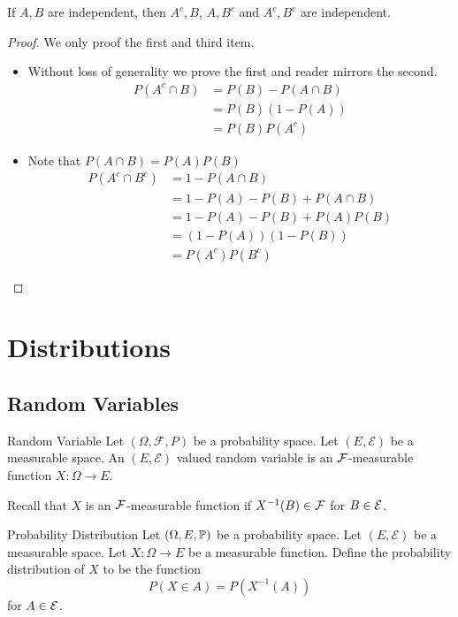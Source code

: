 \documentclass[a4paper]{article}
\begin{document}
\begin{prp}{}{} If $A,B$ are independent, then $A^c,B$, $A,B^c$ and $A^c,B^c$ are independent. 
\end{prp}
\begin{proof} We only proof the first and third item. 
\begin{itemize}
\item Without loss of generality we prove the first and reader mirrors the second. 
\begin{align*}
P(A^c\cap B)&=P(B)-P(A\cap B)\\
&=P(B)(1-P(A))\\
&=P(B)P(A^c)
\end{align*}
\item Note that $P(A\cap B)=P(A)P(B)$
\begin{align*}
P(A^c\cap B^c)&=1-P(A\cap B)\\
&=1-P(A)-P(B)+P(A\cap B)\\
&=1-P(A)-P(B)+P(A)P(B)\\
&=(1-P(A))(1-P(B))\\
&=P(A^c)P(B^c)
\end{align*}
\end{itemize}
\end{proof}

\pagebreak
\section{Distributions}
\subsection{Random Variables}
\begin{defn}{Random Variable}{} Let $(\Omega,\mathcal{F},P)$ be a probability space. Let $(E,\mathcal{E})$ be a measurable space. An $(E,\mathcal{E})$ valued random variable is an $\mathcal{F}$-measurable function $X:\Omega\to E$. 
\end{defn}

Recall that $X$ is an $\mathcal{F}$-measurable function if $X^{-1}(B)\in\mathcal{F}$ for $B\in\mathcal{E}$. 

\begin{defn}{Probability Distribution}{} Let $(\Omega,E,\mathbb{P})$ be a probability space. Let $(E,\mathcal{E})$ be a measurable space. Let $X:\Omega\to E$ be a measurable function. Define the probability distribution of $X$ to be the function $$P(X\in A)=P(X^{-1}(A))$$ for $A\in\mathcal{E}$. 
\end{defn}
\end{document}
